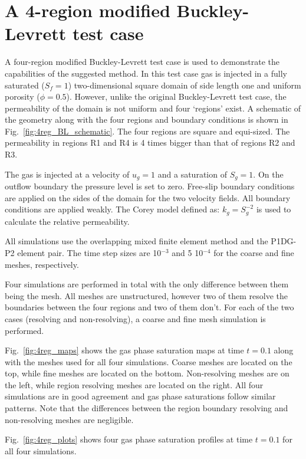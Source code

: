\documentclass[preprint,authoryear,12pt]{elsarticle}
\begin{document}
{\section{A 4-region modified Buckley-Levrett test case}
\label{res2}
A four-region modified Buckley-Levrett test case is used to
demonstrate the capabilities of the suggested method.  In this test
case gas is injected in a fully saturated ($S_f=1$) two-dimensional
square domain of side length one and uniform porosity
($\phi=0.5$). However, unlike the original Buckley-Levrett test case,
the permeability of the domain is not uniform and four `regions'
exist. A schematic of the geometry along with the four regions and
boundary conditions is shown in Fig.~\ref{fig:4reg_BL_schematic}.  The
four regions are square and equi-sized. The permeability in regions R1
and R4 is 4 times bigger than that of regions R2 and R3.



The gas is injected at a
velocity of $u_g=1$ and a saturation of $S_g=1$. On the outflow
boundary the pressure level is set to zero.
Free-slip boundary conditions are
applied on the sides of the domain for the two velocity fields.
All boundary conditions
are applied weakly.
The Corey model defined as:
$k_g = S_g^{-2}$ is used to calculate the relative permeability.



All simulations use the overlapping mixed finite element method and the
P1DG-P2 element pair. The time step sizes are 10$^{-3}$ and 5 10$^{-4}$
for the coarse and fine meshes, respectively.



Four simulations are performed in total with the only difference
between them being the mesh. All meshes are unstructured, however two
of them resolve the boundaries between the four regions and two of
them don't. For each of the two cases (resolving and non-resolving), a
coarse and fine mesh simulation is performed.

Fig.~\ref{fig:4reg_maps} shows the gas phase saturation maps at time
$t=0.1$ along with the meshes used for all four simulations. Coarse
meshes are located on the top, while fine meshes are located on the
bottom. Non-resolving meshes are on the left, while region resolving
meshes are located on the right. All four simulations are in good
agreement and gas phase saturations follow similar patterns. Note
that the differences between the region boundary resolving and
non-resolving meshes are negligible.

Fig.~\ref{fig:4reg_plots} shows four gas phase saturation profiles at
time $t=0.1$ for all four simulations.


}
\end{document}
